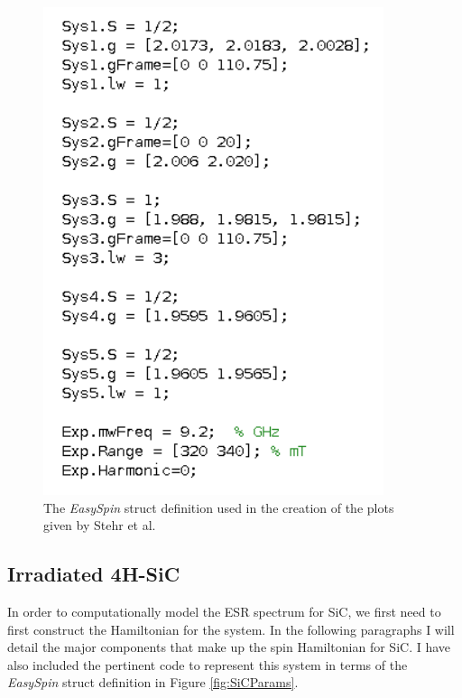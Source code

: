 \documentclass[oneside]{BYUPhys}
\begin{document}
\begin{figure}[h]
    \centerline{\includegraphics{stehr_code_fig}}
    \caption[The \textit{EasySpin} Representation of ZnO Nanowires]{\label{fig:StehrCode}
     The \textit{EasySpin} struct definition used in the creation of the plots given by Stehr et al.}
 \end{figure}

\subsection{Irradiated 4H-SiC}

In order to computationally model the ESR spectrum for SiC, we first need to first construct the Hamiltonian for the system. In the following paragraphs I will detail the major components that make up the spin Hamiltonian for SiC. I have also included the pertinent code to represent this system in terms of the \textit{EasySpin} struct definition in Figure \ref{fig:SiCParams}.
\end{document}
